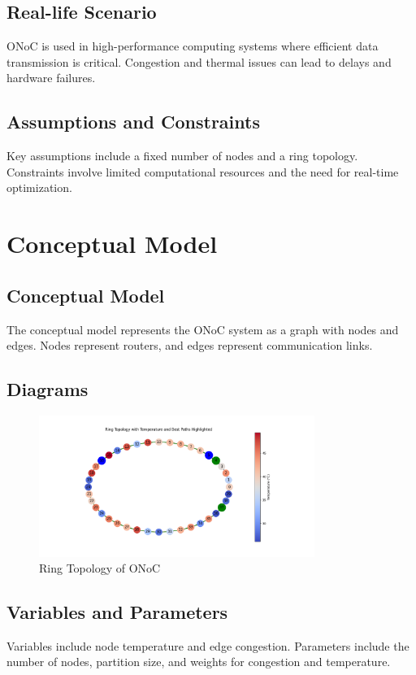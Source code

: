 \documentclass[12pt]{article}
\begin{document}
\subsection{Real-life Scenario}
ONoC is used in high-performance computing systems where efficient data transmission is critical. Congestion and thermal issues can lead to delays and hardware failures.

\subsection{Assumptions and Constraints}
Key assumptions include a fixed number of nodes and a ring topology. Constraints involve limited computational resources and the need for real-time optimization.

\section{Conceptual Model}
\subsection{Conceptual Model}
The conceptual model represents the ONoC system as a graph with nodes and edges. Nodes represent routers, and edges represent communication links.

\subsection{Diagrams}
\begin{figure}[h]
    \centering
    \includegraphics[width=0.8\textwidth]{ring_topology.png}
    \caption{Ring Topology of ONoC}
    \label{fig:ring_topology}
\end{figure}

\subsection{Variables and Parameters}
Variables include node temperature and edge congestion. Parameters include the number of nodes, partition size, and weights for congestion and temperature.
\end{document}
